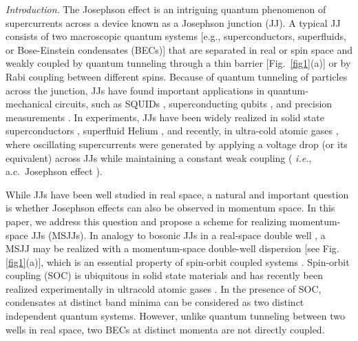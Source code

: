 \documentclass[twocolumn,prl,floatfix,citeautoscript,nofootinbib,superscriptaddress]{revtex4}
\begin{document}
{\color{blue}\emph{Introduction}}. The Josephson effect \cite%
{Josephson1962,Josephson1974} is an intriguing quantum phenomenon of
supercurrents across a device known as a Josephson junction (JJ). A typical
JJ consists of two macroscopic quantum systems [e.g., superconductors,
superfluids, or Bose-Einstein condensates (BECs)] that are separated in real
or spin space and weakly coupled by quantum tunneling through a thin barrier
[Fig.~\ref{fig1}(a)] or by Rabi coupling between different spins. Because of
quantum tunneling of particles across the junction, JJs have found important
applications in quantum-mechanical circuits, such as SQUIDs \cite%
{Ryu2013,Makhlin2001}, superconducting qubits \cite%
{Martinis2001,Astafiev2006,Martinis2009,Paik2011}, and precision
measurements \cite{Makhlin2001}. In experiments, JJs have been widely
realized in solid state superconductors \cite{Giaever1960,Likharev1979},
superfluid Helium \cite%
{Pereverzev1997,Hoskinson2005,Wheatley1975,Leggett1975}, and recently, in
ultra-cold atomic gases \cite%
{Dalfovo1999,Smerzi1997,Raghavan1999,Williams1999,Ohberg1999,Cataliotti2001,Zibold2010,Albiez2005,Levy2007,Valtolina2015,Burchianti2017,Burchianti2}%
, where oscillating supercurrents were generated by applying a voltage drop
(or its equivalent) across JJs while maintaining a constant weak coupling (%
\textit{i.e.}, a.c.~Josephson effect \cite{Anderson1967}).

While JJs have been well studied in real space, a natural and important
question is whether Josephson effects can also be observed in momentum
space. In this paper, we address this question and propose a scheme for
realizing momentum-space JJs (MSJJs). In analogy to bosonic JJs in a
real-space double well \cite{Albiez2005,Levy2007}, a MSJJ may be realized
with a momentum-space double-well dispersion [see Fig. \ref{fig1}(a)], which
is an essential property of spin-orbit coupled systems \cite%
{Goldman2014,Lin2011}. Spin-orbit coupling (SOC) is ubiquitous in solid
state materials and has recently been realized experimentally in ultracold
atomic gases \cite%
{Lin2011,Zhang2012b,Qu2013a,Olson2014,Hamner2014,Wang2012,Cheuk2012,Williams2013,Lev,Jo,Huang2016, Meng2016,Pan2016}%
. In the presence of SOC, condensates at distinct band minima can be
considered as two distinct independent quantum systems. However, unlike
quantum tunneling between two wells in real space, two BECs at distinct
momenta are not directly coupled.
\end{document}
